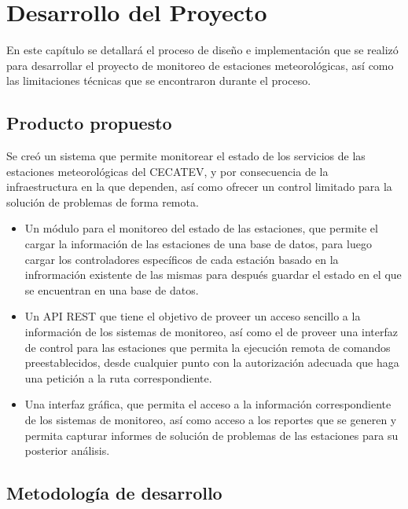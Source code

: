 \chapter{Desarrollo del Proyecto}

En este capítulo se detallará el proceso de diseño e implementación que se realizó para desarrollar el proyecto de monitoreo de estaciones meteorológicas, así como las limitaciones técnicas que se encontraron durante el proceso.

\section{Producto propuesto}

Se creó un sistema que permite monitorear el estado de los servicios de las estaciones meteorológicas del CECATEV, y por consecuencia de la infraestructura en la que dependen, así como ofrecer un control limitado para la solución de problemas de forma remota.


\begin{itemize}
   \item Un módulo para el monitoreo del estado de las estaciones, que permite el cargar la información de las estaciones de una base de datos, para luego cargar los controladores específicos de cada estación basado en la infrormación existente de las mismas para después guardar el estado en el que se encuentran en una base de datos.

   \item Un API REST que tiene el objetivo de proveer un acceso sencillo a la información de los sistemas de monitoreo, así como el de proveer una interfaz de control para las estaciones que permita la ejecución remota de comandos preestablecidos, desde cualquier punto con la autorización adecuada que haga una petición a la ruta correspondiente.

   \item Una interfaz gráfica, que permita el acceso a la información correspondiente de los sistemas de monitoreo, así como acceso a los reportes que se generen y permita capturar informes de solución de problemas de las estaciones para su posterior análisis.
\end{itemize}

\section{Metodología de desarrollo}

